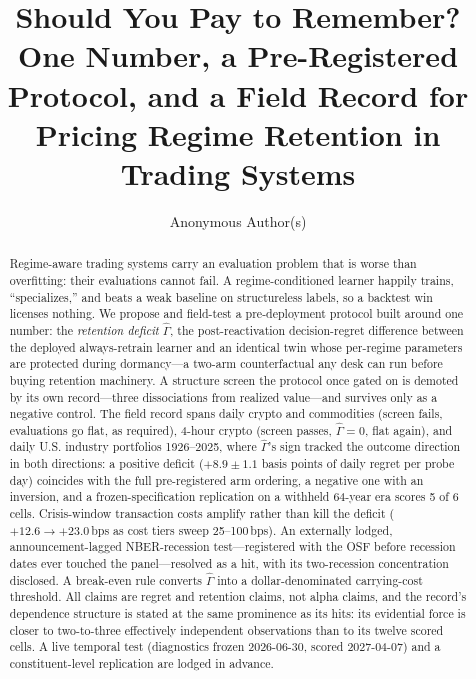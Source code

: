 \documentclass[sigconf,anonymous]{acmart}
\newcommand{\G}{\hat\Gamma}
\begin{document}
\title[Should You Pay to Remember?]{Should You Pay to Remember? One Number,
a Pre-Registered Protocol, and a Field Record for Pricing Regime Retention
in Trading Systems}

\author{Anonymous Author(s)}

\begin{abstract}
Regime-aware trading systems carry an evaluation problem that is worse than
overfitting: their evaluations cannot fail. A regime-conditioned learner
happily trains, ``specializes,'' and beats a weak baseline on structureless
labels, so a backtest win licenses nothing. We propose and field-test a
pre-deployment protocol built around one number: the \emph{retention
deficit} $\G$, the post-reactivation decision-regret difference between the
deployed always-retrain learner and an identical twin whose per-regime
parameters are protected during dormancy---a two-arm counterfactual any
desk can run before buying retention machinery. A structure screen the
protocol once gated on is demoted by its own record---three
dissociations from realized value---and survives only as a negative
control. The field
record spans daily crypto and commodities (screen fails, evaluations go
flat, as required), 4-hour crypto (screen passes, $\G=0$, flat again),
and daily U.S. industry portfolios 1926--2025, where $\G$'s sign tracked
the outcome direction in both directions: a positive deficit
($+8.9\pm1.1$ basis points of daily regret per probe day) coincides with
the full pre-registered arm ordering,
a negative one with an inversion, and a frozen-specification replication on
a withheld 64-year era scores 5 of 6 cells. Crisis-window transaction costs
amplify rather than kill the deficit ($+12.6\to+23.0$\,bps as cost tiers
sweep 25--100\,bps). An externally lodged, announcement-lagged NBER-recession
test---registered with the OSF before recession dates ever touched the
panel---resolved as a hit, with its two-recession concentration disclosed.
A break-even rule converts $\G$ into a dollar-denominated carrying-cost
threshold. All claims are regret and retention claims, not alpha claims,
and the record's dependence structure is stated at the same prominence
as its hits: its evidential force is closer to two-to-three effectively
independent observations than to its twelve scored cells. A
live temporal test (diagnostics frozen 2026-06-30, scored 2027-04-07) and a
constituent-level replication are lodged in advance.
\end{abstract}
\end{document}

